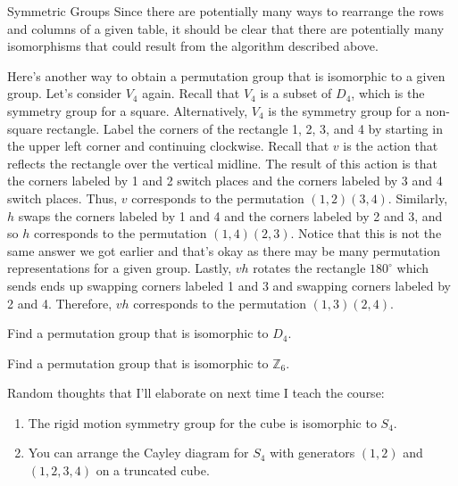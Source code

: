 \begin{section}{Symmetric Groups}
Since there are potentially many ways to rearrange the rows and columns of a given table, it should be clear that there are potentially many isomorphisms that could result from the algorithm described above.

Here's another way to obtain a permutation group that is isomorphic to a given group.  Let's consider \(V_4\) again.  Recall that \(V_4\) is a subset of \(D_4\), which is the symmetry group for a square.  Alternatively, \(V_4\) is the symmetry group for a non-square rectangle.  Label the corners of the rectangle 1, 2, 3, and 4 by starting in the upper left corner and continuing clockwise.  Recall that \(v\) is the action that reflects the rectangle over the vertical midline.  The result of this action is that the corners labeled by 1 and 2 switch places and the corners labeled by 3 and 4 switch places.  Thus, \(v\) corresponds to the permutation \((1,2)(3,4)\).  Similarly, \(h\) swaps the corners labeled by 1 and 4 and the corners labeled by 2 and 3, and so \(h\) corresponds to the permutation \((1,4)(2,3)\).  Notice that this is not the same answer we got earlier and that's okay as there may be many permutation representations for a given group.  Lastly, \(vh\) rotates the rectangle \(180^{\circ}\) which sends ends up swapping corners labeled 1 and 3 and swapping corners labeled by 2 and 4.  Therefore, \(vh\) corresponds to the permutation \((1,3)(2,4)\).

\begin{exercise}
Find a permutation group that is isomorphic to \(D_4\).
\end{exercise}

\begin{exercise}
Find a permutation group that is isomorphic to \(\mathbb{Z}_6\).
\end{exercise}

Random thoughts that I'll elaborate on next time I teach the course:
\begin{enumerate}
\item The rigid motion symmetry group for the cube is isomorphic to \(S_4\).
\item You can arrange the Cayley diagram for \(S_4\) with generators \((1,2)\) and \((1,2,3,4)\) on a truncated cube. 
\end{enumerate}

\end{section}

